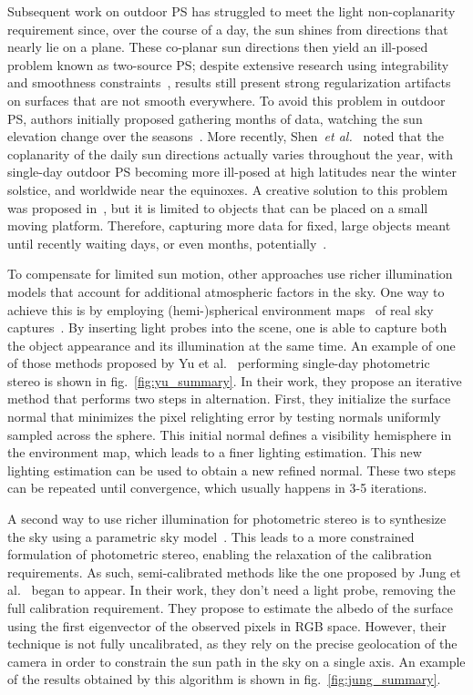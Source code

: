 Subsequent work on outdoor PS has struggled to meet the light non-coplanarity requirement since, over the course of a day, the sun shines from directions that nearly lie on a plane. These co-planar sun directions then yield an ill-posed problem known as two-source PS; despite extensive research using integrability and smoothness constraints~\cite{onn-ijcv-90,hernandez-pami-11}, results still present strong regularization artifacts on surfaces that are not smooth everywhere. To avoid this problem in outdoor PS, authors initially proposed gathering months of data, watching the sun elevation change over the seasons~\cite{abrams-eccv-12,ackermann-cvpr-12}. More recently, Shen~{\em et al.}~\cite{shen-pg-14} noted that the coplanarity of the daily sun directions actually varies throughout the year, with single-day outdoor PS becoming more ill-posed at high latitudes near the winter solstice, and worldwide near the equinoxes. A creative solution to this problem was proposed in~\cite{hung-wacv-15}, but it is limited to objects that can be placed on a small moving platform. Therefore, capturing more data for fixed, large objects meant until recently waiting days, or even months, potentially~\cite{ackermann-cvpr-12,abrams-eccv-12}. 


To compensate for limited sun motion, other approaches use richer illumination models that account for additional atmospheric factors in the sky. One way to achieve this is by employing \mbox{(hemi-)spherical} environment maps~\cite{debevec-siggraph-98} of real sky captures~\cite{yu-iccp-13,shi-3dv-14,hung-wacv-15}. By inserting light probes into the scene, one is able to capture both the object appearance and its illumination at the same time. An example of one of those methods proposed by Yu et al.~\cite{yu-iccp-13} performing single-day photometric stereo is shown in fig.~\ref{fig:yu_summary}. In their work, they propose an iterative method that performs two steps in alternation. First, they initialize the surface normal that minimizes the pixel relighting error by testing normals uniformly sampled across the sphere. This initial normal defines a visibility hemisphere in the environment map, which leads to a finer lighting estimation. This new lighting estimation can be used to obtain a new refined normal. These two steps can be repeated until convergence, which usually happens in 3-5 iterations. 

A second way to use richer illumination for photometric stereo is to synthesize the sky using a parametric sky model~\cite{inose-tcva-13,jung-cvpr-15}. This leads to a more constrained formulation of photometric stereo, enabling the relaxation of the calibration requirements. As such, semi-calibrated methods like the one proposed by Jung et al.~\cite{jung-cvpr-15} began to appear. In their work, they don't need a light probe, removing the full calibration requirement. They propose to estimate the albedo of the surface using the first eigenvector of the observed pixels in RGB space. However, their technique is not fully uncalibrated, as they rely on the precise geolocation of the camera in order to constrain the sun path in the sky on a single axis. An example of the results obtained by this algorithm is shown in fig.~\ref{fig:jung_summary}.


